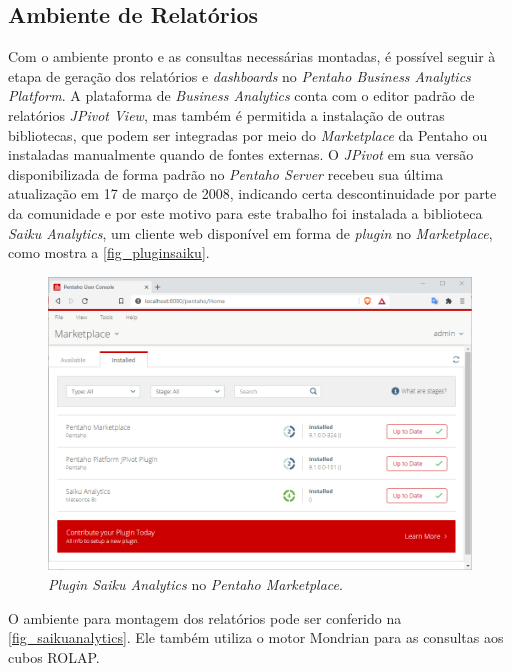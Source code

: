 \subsection{Ambiente de Relatórios}
Com o ambiente pronto e as consultas necessárias montadas, é possível seguir à etapa de geração dos relatórios e \textit{dashboards} no \textit{Pentaho Business Analytics Platform}. A plataforma de \textit{Business Analytics} conta com o editor padrão de relatórios \textit{JPivot View}, mas também é permitida a instalação de outras bibliotecas, que podem ser integradas por meio do \textit{Marketplace} da Pentaho ou instaladas manualmente quando de fontes externas. O \textit{JPivot} em sua versão disponibilizada de forma padrão no \textit{Pentaho Server} recebeu sua última atualização em 17 de março de 2008, indicando certa descontinuidade por parte da comunidade e por este motivo para este trabalho foi instalada a biblioteca \textit{Saiku Analytics}, um cliente web disponível em forma de \textit{plugin} no \textit{Marketplace}, como mostra a \autoref{fig_pluginsaiku}. 
\begin{figure}[htb]
	\caption{\label{fig_pluginsaiku}\textit{Plugin Saiku Analytics} no \textit{Pentaho Marketplace}.}
	\begin{center}
	    \includegraphics[scale=0.6]{Imagens/figura - pluginsaiku.png}
	\end{center}
\end{figure}

\newpage
O ambiente para montagem dos relatórios pode ser conferido na \autoref{fig_saikuanalytics}.
Ele também utiliza o motor Mondrian para as consultas aos cubos ROLAP. 

